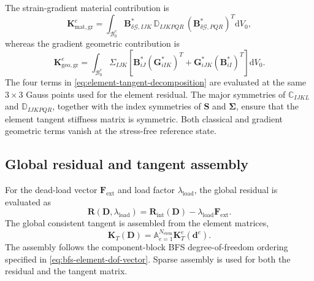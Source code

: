 \documentclass[preprint,12pt]{elsarticle}
\begin{document}
The strain-gradient material contribution is
\begin{equation}
 \mathbf{K}_{\mathrm{mat,gr}}^e
 =\int_{\mathcal{B}_0^e}
 \mathbf{B}_{\delta\mathcal{G},IJK}^{*}\,
 \mathbb{D}_{IJKPQR}\,
 \left(\mathbf{B}_{\delta\mathcal{G},PQR}^{*}\right)^T
 \mathrm{d}V_0,
 \label{eq:gradient-material-tangent}
\end{equation}
whereas the gradient geometric contribution is
\begin{equation}
 \mathbf{K}_{\mathrm{geo,gr}}^e
 =\int_{\mathcal{B}_0^e}
 \Sigma_{IJK}
 \left[
 \mathbf{B}_{iJ}^{*}\left(\mathbf{G}_{iIK}^{*}\right)^T
 +\mathbf{G}_{iJK}^{*}\left(\mathbf{B}_{iI}^{*}\right)^T
 \right]\mathrm{d}V_0.
 \label{eq:gradient-geometric-tangent}
\end{equation}
The four terms in \eqref{eq:element-tangent-decomposition} are evaluated
at the same $3\times3$ Gauss points used for the element residual. The
major symmetries of $\mathbb{C}_{IJKL}$ and
$\mathbb{D}_{IJKPQR}$, together with the index symmetries of $\mathbf{S}$ and
$\boldsymbol{\Sigma}$, ensure that the element tangent stiffness matrix is
symmetric. Both classical and gradient geometric terms vanish at the
stress-free reference state.

\subsection{Global residual and tangent assembly}
\label{sec:global-tangent-assembly}

For the dead-load vector $\mathbf{F}_{\mathrm{ext}}$ and load factor
$\lambda_{\mathrm{load}}$, the global residual is evaluated as
\begin{equation}
 \mathbf{R}(\mathbf{D},\lambda_{\mathrm{load}})
 =\mathbf{R}_{\mathrm{int}}(\mathbf{D})
 -\lambda_{\mathrm{load}}\mathbf{F}_{\mathrm{ext}}.
 \label{eq:global-residual-load-factor}
\end{equation}
The global consistent tangent is assembled from the element matrices,
\begin{equation}
 \mathbf{K}_T(\mathbf{D})
 =\mathbb{A}_{e=1}^{N_{\mathrm{elem}}}
 \mathbf{K}_T^e(\mathbf{d}^e).
 \label{eq:global-tangent-assembly}
\end{equation}
The assembly follows the component-block BFS degree-of-freedom ordering
specified in \eqref{eq:bfs-element-dof-vector}. Sparse assembly is used
for both the residual and the tangent matrix.
\end{document}

